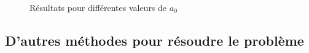 \documentclass[10pt,a4paper]{article}
\theoremstyle{plain}
\theoremstyle{definition}
\begin{document}
\begin{figure}
	\centering
	\caption{Résultats pour différentes valeurs de $a_0$}
	\label{fig:diff}
\end{figure}






\subsection{D'autres méthodes pour résoudre le problème}
\end{document}
